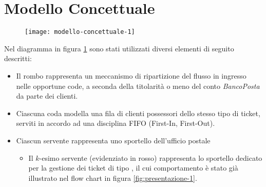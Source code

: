\section{Modello Concettuale}\label{sec:modello-concettuale}\begin{figure}[ht]
\centering
\texttt{[image: modello-concettuale-1]}
\label{fig:modello-concettuale-1}
\end{figure}

Nel diagramma in figura \ref{fig:modello-concettuale-1} sono stati utilizzati diversi elementi di seguito descritti:
\begin{itemize}
\item Il rombo rappresenta un meccanismo di ripartizione del flusso in ingresso nelle opportune code, a seconda della titolarità o meno del conto \textsl{BancoPosta} da parte dei clienti.
\item Ciascuna coda modella una fila di clienti possessori dello stesso tipo di ticket, serviti in accordo ad una disciplina FIFO (First-In, First-Out).
\item Ciascun servente rappresenta uno sportello dell'ufficio postale
\begin{itemize}
\item Il $k$-esimo servente (evidenziato in {\color{red} rosso}) rappresenta lo sportello dedicato per la gestione dei ticket di tipo \sr{}, il cui comportamento è stato già illustrato nel flow chart in figura \ref{fig:presentazione-1}.
\end{itemize}
\end{itemize}

